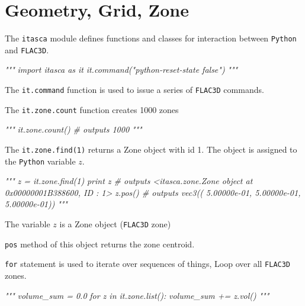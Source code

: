 \documentclass[a4paper, nobind]{templates/ociamthesis}
\newenvironment{Shaded}{\begin{snugshade}}{\end{snugshade}}
\newcommand{\CommentTok}[1]{\textcolor[rgb]{0.56,0.35,0.01}{\textit{#1}}}
\renewenvironment{Shaded}
{
  \vspace{10pt}%
  \begin{snugshade}%
}{%
  \end{snugshade}%
  \vspace{8pt}%
}
\begin{document}
\hypertarget{geometry-grid-zone}{%
\section{Geometry, Grid, Zone}\label{geometry-grid-zone}}

The \texttt{itasca} module defines functions and classes for interaction between \texttt{Python} and \texttt{FLAC3D}.

\begin{Shaded}
\begin{Highlighting}[]
\CommentTok{"""}
\CommentTok{import itasca as it}
\CommentTok{it.command("python{-}reset{-}state false")}
\CommentTok{"""}
\end{Highlighting}
\end{Shaded}

The \texttt{it.command} function is used to issue a series of \texttt{FLAC3D} commands.

The \texttt{it.zone.count} function creates 1000 zones

\begin{Shaded}
\begin{Highlighting}[]
\CommentTok{"""}
\CommentTok{it.zone.count() \# outputs 1000}
\CommentTok{"""}
\end{Highlighting}
\end{Shaded}

The \texttt{it.zone.find(1)} returns a Zone object with id 1. The object is assigned to the \texttt{Python} variable \(z\).

\begin{Shaded}
\begin{Highlighting}[]
\CommentTok{"""}
\CommentTok{z = it.zone.find(1)}
\CommentTok{print z \# outputs \textless{}itasca.zone.Zone object at 0x00000001B388600, ID : 1\textgreater{}}
\CommentTok{z.pos() \# outputs vec3(( 5.00000e{-}01, 5.00000e{-}01, 5.00000e{-}01))}
\CommentTok{"""}
\end{Highlighting}
\end{Shaded}

The variable \(z\) is a Zone object (\texttt{FLAC3D} zone)

\texttt{pos} method of this object returns the zone centroid.

\texttt{for} statement is used to iterate over sequences of things,
Loop over all \texttt{FLAC3D} zones.

\begin{Shaded}
\begin{Highlighting}[]
\CommentTok{"""}
\CommentTok{volume\_sum = 0.0}
\CommentTok{for z in it.zone.list():}
\CommentTok{  volume\_sum += z.vol()}
\CommentTok{"""}
\end{Highlighting}
\end{Shaded}
\end{document}
